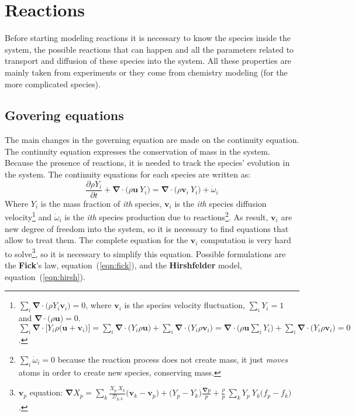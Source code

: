 \section{Reactions} \label{app:app4}
Before starting modeling reactions it is necessary to know the species inside the system, the possible reactions that can happen and all the parameters related to transport and diffusion of these species into the system. All these properties are mainly taken from experiments or they come from chemistry modeling (for the more complicated species). 
    
\subsection{Govering equations}
    The main changes in the governing equation are made on the continuity equation. The continuity equation expresses the conservation of mass in the system. Because the presence of reactions, it is needed to track the species' evolution in the system. The continuity equations for each species are written as:
    \begin{equation}
        \frac{\partial \rho Y_i}{\partial t} + \boldsymbol{\nabla} \cdot \big( \rho \boldsymbol{u} \ Y_i  \big) = \boldsymbol{\nabla} \cdot \big( \rho \boldsymbol{v}_i \ Y_i \big) + \dot\omega_i
    \end{equation}
    Where $Y_i$ is the mass fraction of \textit{ith} species, $\boldsymbol{v}_i$ is the \textit{ith} species diffusion velocity\footnote{$\sum_i \boldsymbol{\nabla} \cdot \big( \rho Y_i \boldsymbol{v}_i \big) = 0$, where $\boldsymbol{v}_i$ is the species velocity fluctuation, $\sum_i Y_i = 1$ and $\boldsymbol{\nabla} \cdot \big( \rho \boldsymbol{u} \big) = 0$. \newline $\sum_i \boldsymbol{\nabla} \cdot \big[ Y_i \rho \big(\boldsymbol{u} + \boldsymbol{v}_i \big) \big] = \sum_i \boldsymbol{\nabla} \cdot \big( Y_i \rho \boldsymbol{u} \big) + \sum_i \boldsymbol{\nabla} \cdot \big( Y_i \rho \boldsymbol{v}_i \big) = \boldsymbol{\nabla} \cdot \big( \rho \boldsymbol{u} \sum_i Y_i \big) + \sum_i \boldsymbol{\nabla} \cdot \big( Y_i \rho \boldsymbol{v}_i \big) = 0$.} and $\dot\omega_i$ is the \textit{ith} species production due to reactions\footnote{$\sum_i \dot\omega_i = 0$ because the reaction process does not create mass, it just \textit{moves} atoms in order to create new species, conserving mass.}. As result, $\boldsymbol{v}_i$ are new degree of freedom into the system, so it is necessary to find equations that allow to treat them. The complete equation for the $\boldsymbol{v}_i$ computation is very hard to solve\footnote{$\boldsymbol{v}_p$ equation: $\boldsymbol{\nabla}X_p = \sum_k \frac{X_p \ X_k}{\mathcal{D}_{p, k}}\big( \boldsymbol{v}_k - \boldsymbol{v}_p \big) + ( Y_p - Y_k \big) \frac{\boldsymbol{\nabla} p}{p} + \frac{\rho}{p} \ \sum_k Y_p \ Y_k \big( f_p - f_k \big)$.}, so it is necessary to simplify this equation. Possible formulations are the \textbf{Fick}'s law, equation~(\ref{eqn:fick}), and the \textbf{Hirshfelder} model, equation~(\ref{eqn:hirsh}).

